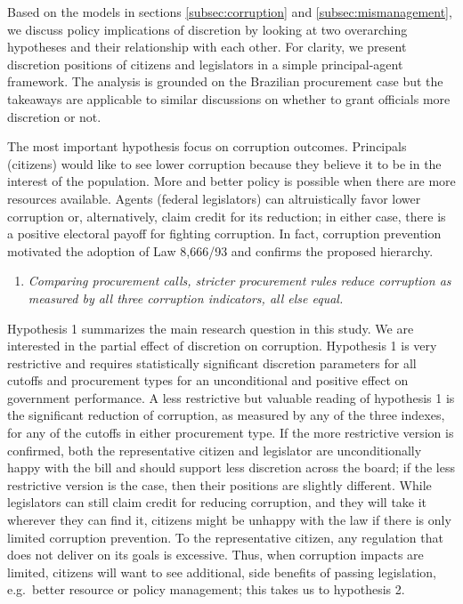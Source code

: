 \documentclass[11pt]{article}
\newcommand{\hypopen}{Comparing procurement calls}
\begin{document}
Based on the models in sections \ref{subsec:corruption} and \ref{subsec:mismanagement}, we discuss policy implications of discretion by looking at two overarching hypotheses and their relationship with each other. For clarity, we present discretion positions of citizens and legislators in a simple principal-agent framework. The analysis is grounded on the Brazilian procurement case but the takeaways are applicable to similar discussions on whether to grant officials more discretion or not.

The most important hypothesis focus on corruption outcomes. Principals (citizens) would like to see lower corruption because they believe it to be in the interest of the population. More and better policy is possible when there are more resources available. Agents (federal legislators) can altruistically favor lower corruption or, alternatively, claim credit for its reduction; in either case, there is a positive electoral payoff for fighting corruption. In fact, corruption prevention motivated the adoption of Law 8,666/93 and confirms the proposed hierarchy.

\begin{enumerate}[label = H\arabic{enumi}:, font = \bfseries, labelindent = \parindent, leftmargin = *, resume] %
  \item \textit{\hypopen, stricter procurement rules reduce corruption as measured by all three corruption indicators, \emph{all else equal}.}
\end{enumerate}

Hypothesis 1 summarizes the main research question in this study. We are interested in the partial effect of discretion on corruption. Hypothesis 1 is very restrictive and requires statistically significant discretion parameters for all cutoffs and procurement types for an unconditional and positive effect on government performance. A less restrictive but valuable reading of hypothesis 1 is the significant reduction of corruption, as measured by any of the three indexes, for any of the cutoffs in either procurement type. If the more restrictive version is confirmed, both the representative citizen and legislator are unconditionally happy with the bill and should support less discretion across the board; if the less restrictive version is the case, then their positions are slightly different. While legislators can still claim credit for reducing corruption, and they will take it wherever they can find it, citizens might be unhappy with the law if there is only limited corruption prevention. To the representative citizen, any regulation that does not deliver on its goals is excessive. Thus, when corruption impacts are limited, citizens will want to see additional, side benefits of passing legislation, e.g.~better resource or policy management; this takes us to hypothesis 2.
\end{document}
